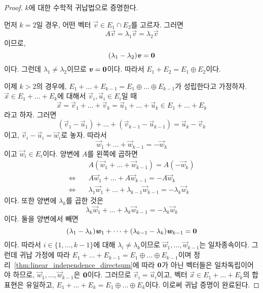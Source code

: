 \documentclass[sections/engineering_mathematics_lecture_note.tex]{subfiles}
\begin{document}
\begin{proof}
    $k$에 대한 수학적 귀납법으로 증명한다.

    먼저 $k = 2$일 경우, 어떤 벡터 $\vec v \in E_1 \cap E_2$를 고르자.
    그러면
    \begin{equation*}
        A \vec v = \lambda_1 \vec v = \lambda_2 \vec v
    \end{equation*}
    이므로,
    \begin{equation*}
        (\lambda_1 - \lambda_2) \bm{\mathit{v}} = \bm{\mathrm{0}}
    \end{equation*}
    이다.
    그런데 $\lambda_1 \neq \lambda_2$이므로 $\bm{\mathit{v}} = \bm{\mathrm{0}}$이다.
    따라서 $E_1 + E_2 = E_1 \oplus E_2$이다.

    이제 $k > 2$의 경우에, $E_1 + \dots + E_{k - 1} = E_1 \oplus \dots \oplus E_{k - 1}$가 성립한다고 가정하자.
    $\vec x \in E_1 + \dots + E_k$에 대해서 $\vec v_i, \vec u_i \in E_i$일 때
    \begin{equation*}
        \vec x = \vec v_1 + \dots + \vec v_k = \vec u_1 + \dots + \vec u_k \in E_1 + \dots + E_k
    \end{equation*}
    라고 하자.
    그러면
    \begin{equation*}
        (\vec v_1 - \vec u_1) + \dots + (\vec v_{k - 1} - \vec u_{k - 1}) = \vec u_k - \vec v_k
    \end{equation*}
    이고, $\vec v_i - \vec u_i = \vec w_i$로 놓자.
    따라서
    \begin{equation*}
        \vec w_1 + \dots + \vec w_{k - 1} = -\vec w_k
    \end{equation*}
    이고 $\vec w_i \in E_i$이다.
    양변에 $A$를 왼쪽에 곱하면
    \begin{align*}
        &A(\vec w_1 + \dots + \vec w_{k - 1}) = A(-\vec w_k)\\
        \Leftrightarrow\quad &A \vec w_1 + \dots + A \vec w_{k - 1} = -A \vec w_k\\
        \Leftrightarrow\quad &\lambda_1 \vec w_1 + \dots + \lambda_{k - 1} \vec w_{k - 1} = - \lambda_k \vec w_k
    \end{align*}
    이다.
    또한 양변에 $\lambda_k$를 곱한 것은
    \begin{equation*}
        \lambda_k \vec w_1 + \dots + \lambda_k \vec w_{k - 1} = -\lambda_k \vec w_k
    \end{equation*}
    이다.
    둘을 양변에서 빼면
    \begin{equation*}
        (\lambda_1 - \lambda_k) \bm{\mathit{w}}_1 + \dots + (\lambda_{k - 1} - \lambda_k) \bm{\mathit{w}}_{k - 1} = \bm{\mathrm{0}}
    \end{equation*}
    이다.
    따라서 $i \in \{1, \dots, k - 1\}$에 대해 $\lambda_i \neq \lambda_k$이므로 $\vec w_1, \dots, \vec w_{k - 1}$는 일차종속이다.
    그런데 귀납 가정에 따라 $E_1 + \dots + E_{k - 1} = E_1 \oplus \dots \oplus E_{k - 1}$이며 정리~\ref{thm:linear_independence_directsum}에 따라 $\bm{\mathrm{0}}$가 아닌 벡터들은 일차독립이어야 하므로, $\vec w_1, \dots, \vec w_{k - 1}$은 $\bm{\mathrm{0}}$이다.
    그러므로 $\vec v_i = \vec u_i$이고, 벡터 $\vec x \in E_1 + \dots + E_k$의 합 표현은 유일하고, $E_1 + \dots + E_k = E_1 \oplus \dots \oplus E_k$이다.
    이로써 귀납 증명이 완료된다.
\end{proof}
\end{document}
